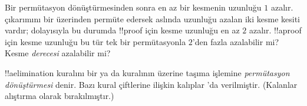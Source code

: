 \documentclass[../../../include/open-logic-section]{subfiles}
\begin{document}
\begin{prob}
Bir permütasyon dönüştürmesinden sonra en az bir kesmenin uzunluğu
$1$ azalır. \Elim{\land} çıkarımını bir \Elim{\lor} üzerinden permüte
edersek aslında uzunluğu azalan iki kesme kesiti vardır; dolayısıyla bu
durumda !!{proof} için kesme uzunluğu en az $2$ azalır. !!a{proof} için
kesme uzunluğu bu tür tek bir permütasyonla $2$'den fazla azalabilir
mi? Kesme \emph{derecesi} azalabilir mi?
\end{prob}

!!a{elimination} kuralını bir \Elim{\lor} ya da \Elim{\lexists}
kuralının üzerine taşıma işlemine \emph{permütasyon dönüştürmesi}
denir. Bazı kural çiftlerine ilişkin kalıplar
'da verilmiştir. (Kalanlar alıştırma
olarak bırakılmıştır.)

\end{document}
